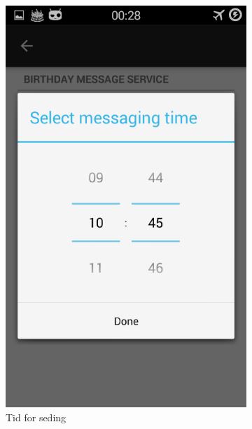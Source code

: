 \begin{figure}[ht]
\begin{subfigure}[b]{0.35\textwidth}
        \includegraphics[width=\textwidth]{./img/8.png}
        \caption{Tid for seding}
        \label{fig:melding_tid}
    \end{subfigure}
    \begin{subfigure}[b]{0.35\textwidth}

\end{subfigure}
\end{figure}
